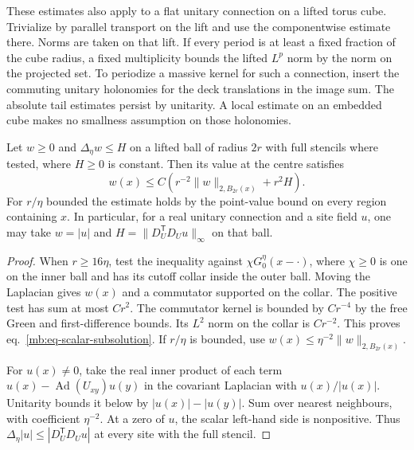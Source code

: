 \documentclass[11pt,letterpaper,reqno]{amsart}
\makeatletter
\numberwithin{equation}{section}
\renewcommand{\eqref}[1]{\textup{eq.~\ref{#1}}}
\theoremstyle{definition}
\newcommand{\ms@minorstart}{%
  \pushQED{\qed}\renewcommand{\qedsymbol}{$\blacksquare$}}
\newenvironment{lemma}[1][]{\ms@minorstart\ms@lemma[#1]}
  {\popQED\endms@lemma}
\theoremstyle{remark}
\makeatother
\begin{document}
These estimates also apply to a flat unitary connection on a
lifted torus cube. Trivialize by parallel transport on the
lift and use the componentwise estimate there. Norms are taken
on that lift. If every period is at least a fixed fraction of
the cube radius, a fixed multiplicity bounds the lifted \(L^p\)
norm by the norm on the projected set. To periodize
a massive kernel for such a connection, insert the commuting
unitary holonomies for the deck translations in the image
sum. The absolute tail estimates persist by unitarity. A local
estimate on an embedded cube makes no smallness assumption
on those holonomies.

\begin{lemma}[Scalar subsolution and covariant modulus]
\label{mb:lem-scalar-subsolution}
Let \(w\ge0\) and \(\Delta_\eta w\le H\) on a lifted ball
of radius \(2r\) with full stencils where tested, where \(H\ge0\)
is constant. Then its value at the centre satisfies
\begin{equation}\label{mb:eq-scalar-subsolution}
 w(x)\le C(r^{-2}\|w\|_{2,B_{2r}(x)}+r^2H).
\end{equation}
For \(r/\eta\) bounded the estimate holds by the point-value
bound on every region containing \(x\).
In particular, for a real unitary connection and a site field
\(u\), one may take \(w=|u|\) and
\(H=\|D_U^{\mathsf T}D_Uu\|_\infty\) on that ball.
\end{lemma}

\begin{proof}
When \(r\ge16\eta\), test the inequality against
\(\chi G_0^\eta(x-\cdot)\), where \(\chi\ge0\) is one on the
inner ball and has its cutoff collar inside the outer ball.
Moving the Laplacian gives \(w(x)\) and a commutator supported
on the collar. The positive test has sum at most \(Cr^2\).
The commutator kernel is bounded by \(Cr^{-4}\) by the free
Green and first-difference bounds. Its \(L^2\) norm on the
collar is \(Cr^{-2}\). This proves \eqref{mb:eq-scalar-subsolution}.
If \(r/\eta\) is bounded, use
\(w(x)\le\eta^{-2}\|w\|_{2,B_{2r}(x)}\).

For \(u(x)\ne0\), take the real inner product of each term
\(u(x)-\operatorname{Ad}(U_{xy})u(y)\) in the covariant
Laplacian with \(u(x)/|u(x)|\). Unitarity bounds it below
by \(|u(x)|-|u(y)|\). Sum over nearest neighbours, with
coefficient \(\eta^{-2}\). At a zero of \(u\), the scalar
left-hand side is nonpositive. Thus
\(\Delta_\eta|u|\le |D_U^{\mathsf T}D_Uu|\) at every site
with the full stencil.
\end{proof}
\end{document}

